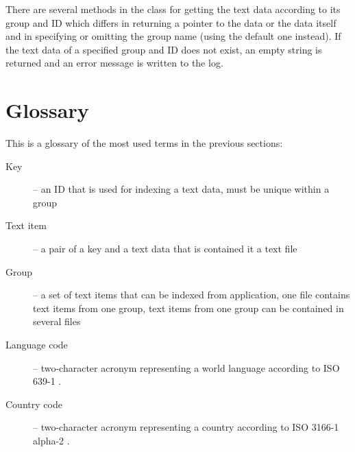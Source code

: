 There are several methods in the class for getting the text data according to its group and ID which differs in returning a pointer to the data or the data itself and in specifying or omitting the group name (using the default one instead). If the text data of a specified group and ID does not exist, an empty string is returned and an error message is written to the log.

\section{Glossary}
This is a glossary of the most used terms in the previous sections:

\begin{description}
  \item[Key] -- an ID that is used for indexing a text data, must be unique within a group
  \item[Text item] -- a pair of a key and a text data that is contained it a text file
  \item[Group] -- a set of text items that can be indexed from application, one file contains text items from one group, text items from one group can be contained in several files
  \item[Language code] -- two-character acronym representing a world language according to ISO 639-1 \cite{ISO-639-1}.
  \item[Country code] -- two-character acronym representing a country according to ISO 3166-1 alpha-2 \cite{ISO-3166-1}.
\end{description}
